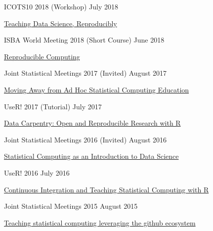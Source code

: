 \documentclass[margin,line]{res}
\begin{document}
\begin{resume}
ICOTS10 2018 (Workshop) \hfill July 2018
\begin{list1}
\item[] \href{https://mine-cetinkaya-rundel.github.io/teach-data-sci-icots2018/}{Teaching Data Science, Reproducibly}
\end{list1}
\vspace{-3mm}

ISBA World Meeting 2018 (Short Course) \hfill June 2018
\begin{list1}
\item[] \href{https://mine-cetinkaya-rundel.github.io/repro-compute-isba18/}{Reproducible Computing}
\end{list1}
\vspace{-3mm}

Joint Statistical Meetings 2017 (Invited) \hfill August 2017
\begin{list1}
\item[] \href{https://github.com/rundel/Presentations/tree/master/JSM%202017}{Moving Away from Ad Hoc Statistical Computing Education}
\end{list1}
\vspace{-3mm}

UseR! 2017 (Tutorial) \hfill July 2017
\begin{list1}
\item[] \href{https://github.com/fmichonneau/2017-useR-reproducibility/}{Data Carpentry: Open and Reproducible Research with R}
\end{list1}
\vspace{-3mm}

Joint Statistical Meetings 2016 (Invited) \hfill August 2016
\begin{list1}
\item[] \href{https://github.com/rundel/Presentations/tree/master/JSM%202016}{Statistical Computing as an Introduction to Data Science}
\end{list1}
\vspace{-3mm}

UseR! 2016 \hfill July 2016
\begin{list1}
\item[] \href{https://github.com/rundel/Presentations/tree/master/UseR2016}{Continuous Integration and Teaching Statistical Computing with R}
\end{list1}
\vspace{-3mm}


Joint Statistical Meetings 2015 \hfill August 2015
\begin{list1}
\item[] \href{https://github.com/rundel/Presentations/tree/master/JSM%202015}{Teaching statistical computing leveraging the github ecosystem}
\end{list1}
\vspace{-3mm}


\end{resume}
\end{document}
